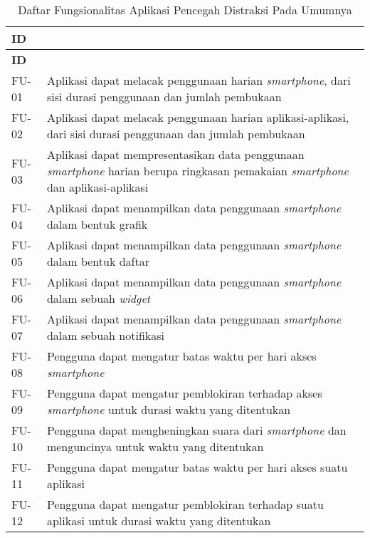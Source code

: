 \RaggedLeft
\begin{footnotesize}
\begin{longtable}[c]{|W{c}{0.07\textwidth}|>{\ccnormspacing}m{0.86\textwidth}|}
  \caption{Daftar Fungsionalitas Aplikasi Pencegah Distraksi Pada Umumnya}
  \label{tab:daftar_fungsionalitas_app_umum} \\
  \hline {} \textbf{ID} &  \\ \hline \endfirsthead
  \hline {} \textbf{ID} &  \\ \hline \endhead
  
  \hline \endfoot
  
  FU-01  &  Aplikasi dapat melacak penggunaan harian \textit{smartphone}, dari sisi durasi penggunaan dan jumlah pembukaan \\ \hline
  FU-02  &  Aplikasi dapat melacak penggunaan harian aplikasi-aplikasi, dari sisi durasi penggunaan dan jumlah pembukaan \\ \hline
  FU-03  &  Aplikasi dapat mempresentasikan data penggunaan \textit{smartphone} harian berupa ringkasan pemakaian \textit{smartphone} dan aplikasi-aplikasi \\ \hline
  FU-04  &  Aplikasi dapat menampilkan data penggunaan \textit{smartphone} dalam bentuk grafik \\ \hline
  FU-05  &  Aplikasi dapat menampilkan data penggunaan \textit{smartphone} dalam bentuk daftar \\ \hline
  FU-06  &  Aplikasi dapat menampilkan data penggunaan \textit{smartphone} dalam sebuah \textit{widget} \\ \hline
  FU-07  &  Aplikasi dapat menampilkan data penggunaan \textit{smartphone} dalam sebuah notifikasi \\ \hline
  FU-08  &  Pengguna dapat mengatur batas waktu per hari akses \textit{smartphone} \\ \hline
  FU-09  &  Pengguna dapat mengatur pemblokiran terhadap akses \textit{smartphone} untuk durasi waktu yang ditentukan \\ \hline
  FU-10  &  Pengguna dapat mengheningkan suara dari \textit{smartphone} dan menguncinya untuk waktu yang ditentukan \\ \hline
  FU-11  &  Pengguna dapat mengatur batas waktu per hari akses suatu aplikasi \\ \hline
  FU-12  &  Pengguna dapat mengatur pemblokiran terhadap suatu aplikasi untuk durasi waktu yang ditentukan \\ \hline

\end{longtable}
\end{footnotesize}
